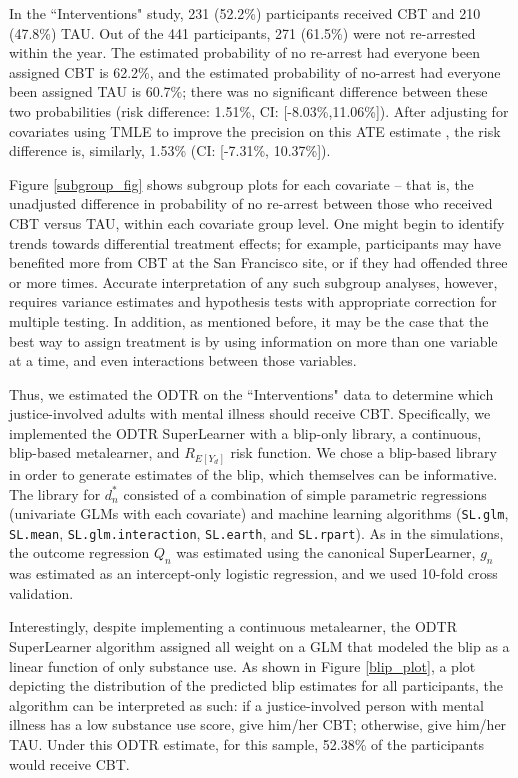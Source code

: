 \documentclass[a4paper,12pt]{article}
\begin{document}
In the ``Interventions" study, 231 (52.2\%) participants received CBT and 210 (47.8\%) TAU. Out of the 441 participants, 271 (61.5\%) were not re-arrested within the year. The estimated probability of no re-arrest had everyone been assigned CBT is 62.2\%, and the estimated probability of no-arrest had everyone been assigned TAU is 60.7\%; there was no significant difference between these two probabilities (risk difference: 1.51\%, CI: [-8.03\%,11.06\%]). After adjusting for covariates using TMLE to improve the precision on this ATE estimate \citep{moore2009covariate}, the risk difference is, similarly, 1.53\% (CI: [-7.31\%, 10.37\%]).

Figure \ref{subgroup_fig} shows subgroup plots for each covariate -- that is, the unadjusted difference in probability of no re-arrest between those who received CBT versus TAU, within each covariate group level. One might begin to identify trends towards differential treatment effects; for example, participants may have benefited more from CBT at the San Francisco site, or if they had offended three or more times. Accurate interpretation of any such subgroup analyses, however, requires variance estimates and hypothesis tests with appropriate correction for multiple testing. In addition, as mentioned before, it may be the case that the best way to assign treatment is by using information on more than one variable at a time, and even interactions between those variables.

Thus, we estimated the ODTR on the ``Interventions" data to determine which justice-involved adults with mental illness should receive CBT. Specifically, we implemented the ODTR SuperLearner with a blip-only library, a continuous, blip-based metalearner, and $R_{E[Y_d]}$ risk function. We chose a blip-based library in order to generate estimates of the blip, which themselves can be informative. The library for $d^*_n$ consisted of a combination of simple parametric regressions (univariate GLMs with each covariate) and machine learning algorithms (\texttt{SL.glm}, \texttt{SL.mean}, \texttt{SL.glm.interaction}, \texttt{SL.earth}, and \texttt{SL.rpart}). As in the simulations, the outcome regression $Q_n$ was estimated using the canonical SuperLearner, $g_n$ was estimated as an intercept-only logistic regression, and we used 10-fold cross validation.

Interestingly, despite implementing a continuous metalearner, the ODTR SuperLearner algorithm assigned all weight on a GLM that modeled the blip as a linear function of only substance use. As shown in Figure \ref{blip_plot}, a plot depicting the distribution of the predicted blip estimates for all participants, the algorithm can be interpreted as such: if a justice-involved person with mental illness has a low substance use score, give him/her CBT; otherwise, give him/her TAU. Under this ODTR estimate, for this sample, 52.38\% of the participants would receive CBT.%
\end{document}
